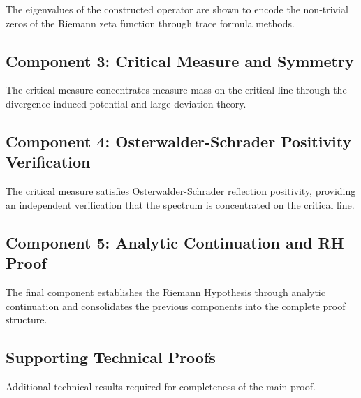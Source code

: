 The eigenvalues of the constructed operator are shown to encode the non-trivial zeros of the Riemann zeta function through trace formula methods.




\subsection{Component 3: Critical Measure and Symmetry}
\label{subsec:criticalMeasure}

The critical measure concentrates measure mass on the critical line through the divergence-induced potential and large-deviation theory.




\subsection{Component 4: Osterwalder-Schrader Positivity Verification}
\label{subsec:osterwalderSchrader}

The critical measure satisfies Osterwalder-Schrader reflection positivity, providing an independent verification that the spectrum is concentrated on the critical line.



\subsection{Component 5: Analytic Continuation and RH Proof}
\label{subsec:analyticContinuation}

The final component establishes the Riemann Hypothesis through analytic continuation and consolidates the previous components into the complete proof structure.



\subsection{Supporting Technical Proofs}
\label{subsec:supportingProofs}

Additional technical results required for completeness of the main proof.





